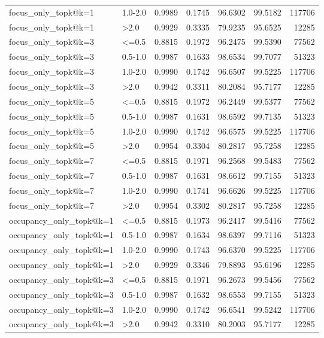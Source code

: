 \begin{tabular}{llrrrrr}
focus_only_topk@k=1 & 1.0-2.0 & 0.9989 & 0.1745 & 96.6302 & 99.5182 & 117706 \\
focus_only_topk@k=1 & >2.0 & 0.9929 & 0.3335 & 79.9235 & 95.6525 & 12285 \\
focus_only_topk@k=3 & <=0.5 & 0.8815 & 0.1972 & 96.2475 & 99.5390 & 77562 \\
focus_only_topk@k=3 & 0.5-1.0 & 0.9987 & 0.1633 & 98.6534 & 99.7077 & 51323 \\
focus_only_topk@k=3 & 1.0-2.0 & 0.9990 & 0.1742 & 96.6507 & 99.5225 & 117706 \\
focus_only_topk@k=3 & >2.0 & 0.9942 & 0.3311 & 80.2084 & 95.7177 & 12285 \\
focus_only_topk@k=5 & <=0.5 & 0.8815 & 0.1972 & 96.2449 & 99.5377 & 77562 \\
focus_only_topk@k=5 & 0.5-1.0 & 0.9987 & 0.1631 & 98.6592 & 99.7135 & 51323 \\
focus_only_topk@k=5 & 1.0-2.0 & 0.9990 & 0.1742 & 96.6575 & 99.5225 & 117706 \\
focus_only_topk@k=5 & >2.0 & 0.9954 & 0.3304 & 80.2817 & 95.7258 & 12285 \\
focus_only_topk@k=7 & <=0.5 & 0.8815 & 0.1971 & 96.2568 & 99.5483 & 77562 \\
focus_only_topk@k=7 & 0.5-1.0 & 0.9987 & 0.1631 & 98.6612 & 99.7155 & 51323 \\
focus_only_topk@k=7 & 1.0-2.0 & 0.9990 & 0.1741 & 96.6626 & 99.5225 & 117706 \\
focus_only_topk@k=7 & >2.0 & 0.9954 & 0.3302 & 80.2817 & 95.7258 & 12285 \\
occupancy_only_topk@k=1 & <=0.5 & 0.8815 & 0.1973 & 96.2417 & 99.5416 & 77562 \\
occupancy_only_topk@k=1 & 0.5-1.0 & 0.9987 & 0.1634 & 98.6397 & 99.7116 & 51323 \\
occupancy_only_topk@k=1 & 1.0-2.0 & 0.9990 & 0.1743 & 96.6370 & 99.5225 & 117706 \\
occupancy_only_topk@k=1 & >2.0 & 0.9929 & 0.3346 & 79.8893 & 95.6196 & 12285 \\
occupancy_only_topk@k=3 & <=0.5 & 0.8815 & 0.1971 & 96.2673 & 99.5456 & 77562 \\
occupancy_only_topk@k=3 & 0.5-1.0 & 0.9987 & 0.1632 & 98.6553 & 99.7155 & 51323 \\
occupancy_only_topk@k=3 & 1.0-2.0 & 0.9990 & 0.1742 & 96.6541 & 99.5242 & 117706 \\
occupancy_only_topk@k=3 & >2.0 & 0.9942 & 0.3310 & 80.2003 & 95.7177 & 12285 \\

\end{tabular}
